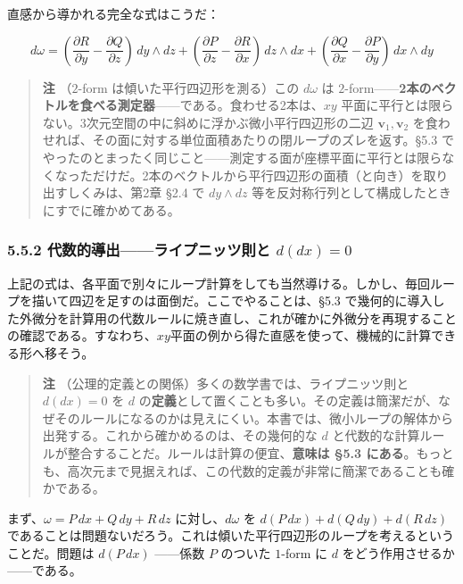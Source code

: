 \documentclass[a4paper,12pt,openany]{book}
\begin{document}
直感から導かれる完全な式はこうだ：

\[d\omega = (\frac{\partial R}{\partial y} - \frac{\partial Q}{\partial z})\,dy \wedge dz + (\frac{\partial P}{\partial z} - \frac{\partial R}{\partial x})\,dz \wedge dx + (\frac{\partial Q}{\partial x} - \frac{\partial P}{\partial y})\,dx \wedge dy\]

\begin{quote}
\textbf{注} （\(2\)-form は傾いた平行四辺形を測る）この \(d\omega\) は
\(2\)-form——\textbf{2本のベクトルを食べる測定器}——である。食わせる2本は、\(xy\)
平面に平行とは限らない。3次元空間の中に斜めに浮かぶ微小平行四辺形の二辺
\(\mathbf{v}_1, \mathbf{v}_2\)
を食わせれば、その面に対する単位面積あたりの閉ループのズレを返す。§5.3
でやったのとまったく同じこと——測定する面が座標平面に平行とは限らなくなっただけだ。2本のベクトルから平行四辺形の面積（と向き）を取り出すしくみは、第2章
§2.4 で \(dy \wedge dz\)
等を反対称行列として構成したときにすでに確かめてある。
\end{quote}

\hypertarget{ux4ee3ux6570ux7684ux5c0eux51faux30e9ux30a4ux30d7ux30cbux30c3ux30c4ux5247ux3068-ddx0}{%
\subsubsection{\texorpdfstring{5.5.2 代数的導出——ライプニッツ則と
\(d(dx)=0\)}{5.5.2 代数的導出——ライプニッツ則と d(dx)=0}}\label{ux4ee3ux6570ux7684ux5c0eux51faux30e9ux30a4ux30d7ux30cbux30c3ux30c4ux5247ux3068-ddx0}}

上記の式は、各平面で別々にループ計算をしても当然導ける。しかし、毎回ループを描いて四辺を足すのは面倒だ。ここでやることは、§5.3
で幾何的に導入した外微分を計算用の代数ルールに焼き直し、これが確かに外微分を再現することの確認である。すなわち、\(xy\)平面の例から得た直感を使って、機械的に計算できる形へ移そう。

\begin{quote}
\textbf{注} （公理的定義との関係）多くの数学書では、ライプニッツ則と
\(d(dx)=0\) を \(d\)
の\textbf{定義}として置くことも多い。その定義は簡潔だが、なぜそのルールになるのかは見えにくい。本書では、微小ループの解体から出発する。これから確かめるのは、その幾何的な
\(d\)
と代数的な計算ルールが整合することだ。ルールは計算の便宜、\textbf{意味は §5.3 にある}。もっとも、高次元まで見据えれば、この代数的定義が非常に簡潔であることも確かである。
\end{quote}

まず、\(\omega = P\,dx + Q\,dy + R\,dz\) に対し、\(d\omega\) を
\(d(P\,dx) + d(Q\,dy) + d(R\,dz)\)
であることは問題ないだろう。これは傾いた平行四辺形のループを考えるということだ。問題は
\(d(P\,dx)\) ——係数 \(P\) のついた \(1\)-form に \(d\)
をどう作用させるか——である。
\end{document}
